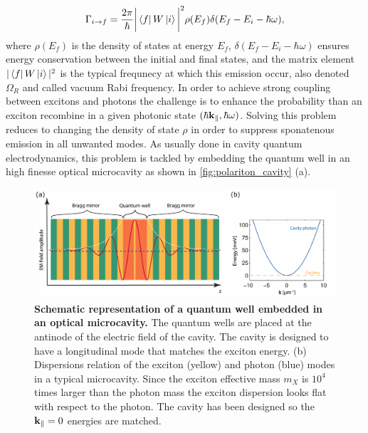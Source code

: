 \begin{equation}
    \Gamma_{i\rightarrow f} = \dfrac{2\pi}{\hbar} \bigg|\bra{f}W\ket{i}\bigg|^2 \rho(E_f)\delta(E_f-E_i-\hbar \omega),
    \label{eq:fermi_golden_rule_1st_order}
\end{equation}
where $\rho(E_f)$ is the density of states at energy $E_f$, $\delta(E_f-E_i-\hbar\omega)$ ensures energy conservation between the initial and final states, and the matrix element $|\bra{f}W\ket{i}|^2$ is the typical frequnecy at which 
this emission occur, also denoted $\Omega_R$ and called vacuum Rabi frequency. 
In order to achieve strong coupling between excitons and photons the challenge is to enhance the probability than an exciton recombine in a given photonic state $(\hbar \mathbf{k}_\parallel, \hbar \omega)$. 
Solving this problem reduces to changing the density of state $\rho$ in order to suppress sponatenous emission in all unwanted modes.
As usually done in cavity quantum electrodynamics, this problem is tackled by embedding the quantum well in an high finesse optical microcavity as shown in \autoref{fig:polariton_cavity} (a). 
\begin{figure}[]
    \centering
    \includegraphics[width=1\linewidth]{chap_theory/fig/polariton_cavity.pdf}
    \caption{\textbf{Schematic representation of a quantum well embedded in an optical microcavity.} The quantum wells are placed at the antinode of the electric field of the cavity. The cavity is designed to have a longitudinal mode that matches the exciton energy.
    (b) Dispersions relation of the exciton (yellow) and photon (blue) modes in a typical microcavity. Since the exciton effective mass $m_X$ is $10^4$ times larger than the photon mass the exciton dispersion 
    looks flat with respect to the photon. The cavity has been designed so the $\mathbf{k}_\parallel=0$ energies are matched.
    \label{fig:polariton_cavity}}
\end{figure}

